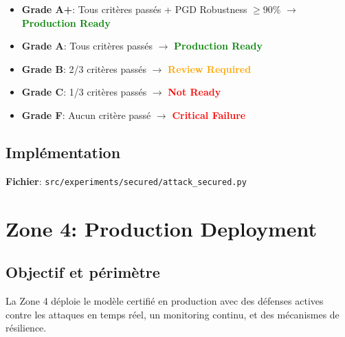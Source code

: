 \documentclass[11pt,a4paper]{article}
\begin{document}
\begin{tcolorbox}[colback=green!5, colframe=green!50!black, title=\textbf{Système de grading}]
\begin{itemize}
    \item \textbf{Grade A+}: Tous critères passés + PGD Robustness $\geq 90\%$ $\rightarrow$ \textcolor{green}{\textbf{Production Ready}}
    \item \textbf{Grade A}: Tous critères passés $\rightarrow$ \textcolor{green}{\textbf{Production Ready}}
    \item \textbf{Grade B}: 2/3 critères passés $\rightarrow$ \textcolor{orange}{\textbf{Review Required}}
    \item \textbf{Grade C}: 1/3 critères passés $\rightarrow$ \textcolor{red}{\textbf{Not Ready}}
    \item \textbf{Grade F}: Aucun critère passé $\rightarrow$ \textcolor{red}{\textbf{Critical Failure}}
\end{itemize}
\end{tcolorbox}

\subsection{Implémentation}

\textbf{Fichier}: \texttt{src/experiments/secured/attack\_secured.py}

\newpage

\section{Zone 4: Production Deployment}

\subsection{Objectif et périmètre}

La Zone 4 déploie le modèle certifié en production avec des défenses actives contre les attaques en temps réel, un monitoring continu, et des mécanismes de résilience.
\end{document}

